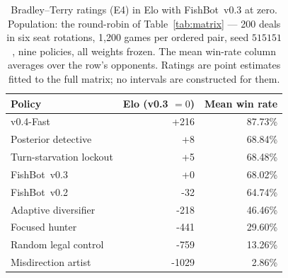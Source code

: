 \documentclass[11pt]{article}
\theoremstyle{definition}
\DeclareRobustCommand{\vfast}{\texorpdfstring{\mbox{v0.4-Fast}}{v0.4-Fast}}
\DeclareRobustCommand{\vthree}{\texorpdfstring{\mbox{FishBot v0.3}}{FishBot v0.3}}
\DeclareRobustCommand{\vtwo}{\texorpdfstring{\mbox{FishBot v0.2}}{FishBot v0.2}}
\newcommand{\numMatrixDeals}{200}
\newcommand{\numMatrixGamesPair}{1{,}200}
\begin{document}
\begin{table}[!htbp]
\centering
\caption{Bradley--Terry ratings (E4) in Elo with \vthree{} at zero. Population:
the round-robin of Table~\ref{tab:matrix} --- \numMatrixDeals{} deals in six seat
rotations, \numMatrixGamesPair{} games per ordered pair, seed $515151$, nine
policies, all weights frozen. The mean win-rate column averages over the row's
opponents. Ratings are point estimates fitted to the full matrix; no intervals
are constructed for them.}
\label{tab:elo}
\small
\begin{tabular}{lrr}
\toprule
Policy & Elo (v0.3 $=0$) & Mean win rate \\
\midrule
\vfast{} & +216 & 87.73\% \\
Posterior detective & +8 & 68.84\% \\
Turn-starvation lockout & +5 & 68.48\% \\
\vthree{} & +0 & 68.02\% \\
\vtwo{} & -32 & 64.74\% \\
Adaptive diversifier & -218 & 46.46\% \\
Focused hunter & -441 & 29.60\% \\
Random legal control & -759 & 13.26\% \\
Misdirection artist & -1029 & 2.86\% \\
\bottomrule
\end{tabular}%
\end{table}
\end{document}
